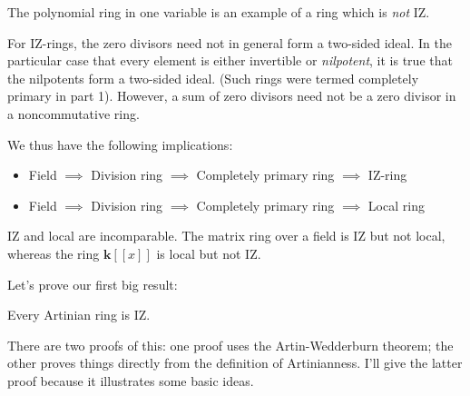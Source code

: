 \documentclass[a4paper]{amsart}
\newcommand{\field}{\mathbf{k}}
\begin{document}
The polynomial ring in one variable is an example of a ring which is
{\em not} IZ.

For IZ-rings, the zero divisors need not in general form a two-sided
ideal. In the particular case that every element is either invertible
or {\em nilpotent}, it is true that the nilpotents form a two-sided
ideal. (Such rings were termed completely primary in part 1). However,
a sum of zero divisors need not be a zero divisor in a noncommutative
ring.

We thus have the following implications:

\begin{itemize}

\item Field $\implies$ Division ring $\implies$ Completely primary
  ring $\implies$ IZ-ring

\item Field $\implies$ Division ring $\implies$ Completely primary
  ring $\implies$ Local ring
\end{itemize}

IZ and local are incomparable. The matrix ring over a field is IZ but
not local, whereas the ring $\field[[x]]$ is local but not IZ.

Let's prove our first big result:

\begin{theorem}
  Every Artinian ring is IZ.
\end{theorem}

There are two proofs of this: one proof uses the Artin-Wedderburn
theorem; the other proves things directly from the definition of
Artinianness. I'll give the latter proof because it illustrates some
basic ideas.
\end{document}
